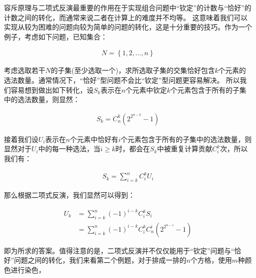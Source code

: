 \documentclass[UTF8]{book}
\begin{document}
容斥原理与二项式反演最重要的作用在于实现组合问题中“钦定”的计数与“恰好”的计数之间的转化，而通常来说二者在计算上的难度并不均等。
这意味着我们可以实现从较为困难的问题向较为简单的问题的转化，这是十分重要的技巧。作为一个例子，考虑如下问题，已知集合：
\begin{large}
    \begin{equation}
        \begin{aligned}
            N=\left \{ 1,2,\dots,n \right \}
            \nonumber
        \end{aligned}
    \end{equation}
\end{large}
考虑选取若干$N$的子集(至少选取一个)，求所选取子集的交集恰好包含$k$个元素的选法数量。通常情况下，“恰好”型问题不会比“钦定”型问题更容易解决。
所以我们容易想到做出如下转化，设$S_k$表示在$n$个元素中钦定$k$个元素包含于所有的子集中的选法数量，则显然：
\begin{large}
    \begin{equation}
        \begin{aligned}
            S_k=C_n^k \left (2^{2^{n-k}}-1\right )
            \nonumber
        \end{aligned}
    \end{equation}
\end{large}
接着我们设$U_i$表示在$n$个元素中恰好有$i$个元素包含于所有的子集中的选法数量，则显然对于$U_i$中的每一种选法，当$i \ge k$时，都会在$S_k$中被重复计算贡献$C_i^k$次，所以我们有：
\begin{large}
    \begin{equation}
        \begin{aligned}
            S_k=\sum_{i=k}^{n} C_i^k U_i
            \nonumber
        \end{aligned}
    \end{equation}
\end{large}
那么根据二项式反演，我们显然可以得到：
\begin{large}
    \begin{equation}
        \begin{aligned}
            U_k &= \sum_{i=k}^{n} (-1)^{i-k} C_i^k S_i \\
            &= \sum_{i=k}^{n} (-1)^{i-k} C_i^k C_n^i \left ( 2^{2^{n-i}}-1 \right )
            \nonumber
        \end{aligned}
    \end{equation}
\end{large}
即为所求的答案。值得注意的是，二项式反演并不仅仅能用于“钦定”问题与“恰好”问题之间的转化，我们来看第二个例题，对于排成一排的$n$个方格，使用$m$种颜色进行染色，
\end{document}
